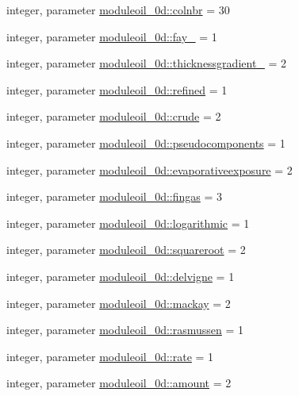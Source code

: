 \begin{DoxyCompactItemize}
\item 
integer, parameter \mbox{\hyperlink{namespacemoduleoil__0d_a3994e483c147f44631095ac0e23a0538}{moduleoil\+\_\+0d\+::colnbr}} = 30
\item 
integer, parameter \mbox{\hyperlink{namespacemoduleoil__0d_a8853fb03d6698ffe8b3fe2a015eb02fa}{moduleoil\+\_\+0d\+::fay\+\_\+}} = 1
\item 
integer, parameter \mbox{\hyperlink{namespacemoduleoil__0d_a3e2005b8a7170d66bb4597b14d5fb82b}{moduleoil\+\_\+0d\+::thicknessgradient\+\_\+}} = 2
\item 
integer, parameter \mbox{\hyperlink{namespacemoduleoil__0d_a0765c6e0740a991efbe77e297cba903d}{moduleoil\+\_\+0d\+::refined}} = 1
\item 
integer, parameter \mbox{\hyperlink{namespacemoduleoil__0d_a5c5771f292167803f757e7551b612ba6}{moduleoil\+\_\+0d\+::crude}} = 2
\item 
integer, parameter \mbox{\hyperlink{namespacemoduleoil__0d_aceadbff511a06679ac44a229ec601150}{moduleoil\+\_\+0d\+::pseudocomponents}} = 1
\item 
integer, parameter \mbox{\hyperlink{namespacemoduleoil__0d_ad902a9dc6f2fa7214ed579187778d11f}{moduleoil\+\_\+0d\+::evaporativeexposure}} = 2
\item 
integer, parameter \mbox{\hyperlink{namespacemoduleoil__0d_a46a8ff5abb7664d438c259236ce34fa3}{moduleoil\+\_\+0d\+::fingas}} = 3
\item 
integer, parameter \mbox{\hyperlink{namespacemoduleoil__0d_a003aee4a4948c37d2a47f050998ef03e}{moduleoil\+\_\+0d\+::logarithmic}} = 1
\item 
integer, parameter \mbox{\hyperlink{namespacemoduleoil__0d_aa0be4a9f3a5d952bcd2769af7e6718c2}{moduleoil\+\_\+0d\+::squareroot}} = 2
\item 
integer, parameter \mbox{\hyperlink{namespacemoduleoil__0d_a7cef07d2fcba2ee01d6b220d1f0dacb1}{moduleoil\+\_\+0d\+::delvigne}} = 1
\item 
integer, parameter \mbox{\hyperlink{namespacemoduleoil__0d_abda97c68a1cb4ffc509c1473edc29b57}{moduleoil\+\_\+0d\+::mackay}} = 2
\item 
integer, parameter \mbox{\hyperlink{namespacemoduleoil__0d_aac138a50bfeae5b8770c4da7e6ff7262}{moduleoil\+\_\+0d\+::rasmussen}} = 1
\item 
integer, parameter \mbox{\hyperlink{namespacemoduleoil__0d_afc4d36d0c03e5571cd2fae4f01faf46b}{moduleoil\+\_\+0d\+::rate}} = 1
\item 
integer, parameter \mbox{\hyperlink{namespacemoduleoil__0d_af633580ca21201c485705f0b999cf21c}{moduleoil\+\_\+0d\+::amount}} = 2

\end{DoxyCompactItemize}

